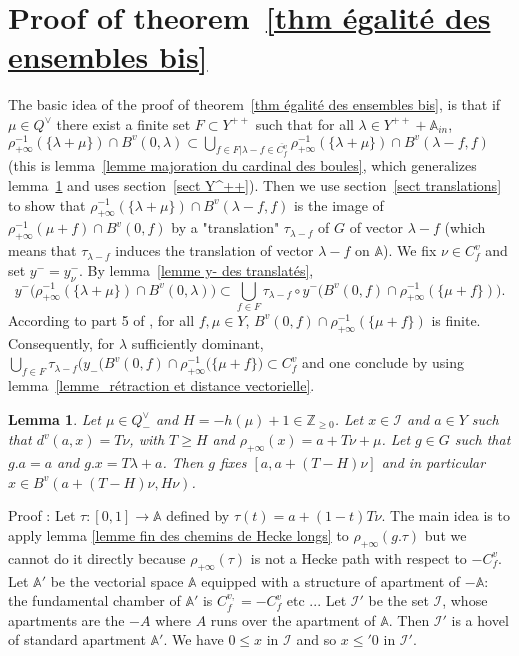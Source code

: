 \documentclass[12pt]{article}
\theoremstyle{plain}
\newtheorem{lemme}[thm]{Lemma}
\theoremstyle{definition}
\newcommand{\A}{\mathbb{A}}
\begin{document}
 

\section{Proof of theorem~\ref{thm égalité des ensembles bis}}\label{sect proof of final theorem}

The basic idea of the proof of theorem~\ref{thm égalité des ensembles bis}, is that if $\mu\in Q^\vee$ there exist a finite set $F\subset Y^{++}$ such that for all $\lambda\in Y^{++}+\A_{in}$, $\rho_{+\infty}^{-1}(\{\lambda+\mu\})\cap B^v(0,\lambda) \subset \bigcup_{f\in F|\lambda-f\in\overline{C^v_f}} \rho_{+\infty}^{-1}(\{\lambda+\mu\})\cap B^v(\lambda-f,f)$ (this is lemma~\ref{lemme majoration du cardinal des boules}, which generalizes lemma~\ref{lemme distance finie à l'appartement} and uses section~\ref{sect Y^++}). Then we use section~\ref{sect translations} to show  that $\rho_{+\infty}^{-1}(\{\lambda+\mu\})\cap B^v(\lambda-f,f)$ is the image of $\rho_{+\infty}^{-1}(\mu+f)\cap B^v(0,f)$ by a "translation" $\tau_{\lambda-f}$ of $G$ of vector $\lambda-f$ (which means that $\tau_{\lambda-f}$ induces the translation of vector $\lambda-f$ on $\mathbb{A}$). We fix $\nu\in C_f^v$ and set $y^-=y_\nu^-$. By lemma~\ref{lemme y- des translatés},  \[y^-\big(\rho_{+\infty}^{-1}(\{\lambda+\mu\})\cap B^v(0,\lambda)\big)\subset\bigcup_{f\in F}\tau_{\lambda-f}\circ y^-\big(B^v(0,f)\cap \rho_{+\infty}^{-1}(\{\mu +f\})\big).\] According to part 5 of \cite{gaussent2014spherical}, for all $f, \mu \in Y$, $B^v(0,f)\cap \rho_{+\infty}^{-1}(\{\mu +f\})$ is finite. Consequently, for $\lambda$ sufficiently dominant, $\bigcup_{f\in F}\tau_{\lambda-f}\big(y_-(B^v(0,f)\cap \rho_{+\infty}^{-1}(\{\mu +f\}\big)\subset C^v_f$  and one conclude by using lemma~\ref{lemme_rétraction et distance vectorielle}. 
 



\begin{lemme}\label{lemme distance finie à l'appartement}
Let $\mu\in Q^\vee_-$ and $H=-h(\mu)+1\in \mathbb{Z}_{\geq 0}$. Let $x\in \mathcal{I}$ and $a\in Y$ such that $d^v(a,x)=T\nu$, with $T\geq H$ and $\rho_{+\infty}(x)=a+T\nu +\mu$. Let $g\in G$ such that $g.a=a$ and $g.x=T\lambda+a$. Then $g$ fixes $[a,a+(T-H)\nu]$ and in particular $x\in B^v(a+(T-H)\nu,H\nu)$.
\end{lemme}

Proof : Let $\tau:[0,1]\rightarrow \mathbb{A}$ defined by $\tau(t)=a+(1-t)T\nu$. The main idea is to apply lemma \ref{lemme fin des chemins de Hecke longs} to $\rho_{+\infty}(g.\tau)$ but we cannot do it directly because $\rho_{+\infty}(\tau)$ is not a Hecke path with respect to $-C^v_f$. Let $\mathbb{A}'$ be the vectorial space $\mathbb{A}$ equipped with a structure of apartment of $-\mathbb{A}$: the fundamental chamber of $\mathbb{A}'$ is $C^{v,}_f=-C^v_f$ etc ... Let $\mathcal{I}'$ be the set $\mathcal{I}$, whose apartments are the $-A$ where $A$ runs over the apartment of $\mathbb{A}$. Then $\mathcal{I}'$ is a hovel of standard apartment $\mathbb{A}'$. We have $0\leq x$ in $\mathcal{I}$ and so $x\leq'0$ in $\mathcal{I}'$. 
 
\end{document}
